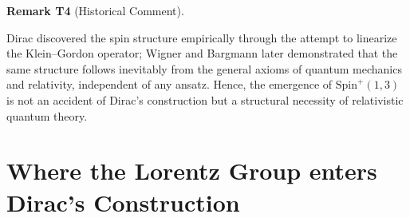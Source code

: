 \documentclass[10pt, letterpaper]{article}
\newcommand{\Spin}{\mathrm{Spin}}
\newcommand{\CustomHeading}[3]{%
  \par\medskip\noindent%
  \textbf{#1 #2} \textnormal{(#3)}.\enskip%
}
\newenvironment{REM}[2]{\begin{unitbox}\CustomHeading{Remark}{#1}{#2}}{\end{unitbox}}
\begin{document}
\begin{REM}{T4}{Historical Comment}
Dirac discovered the spin structure empirically through the attempt to linearize the Klein–Gordon operator;  
Wigner and Bargmann later demonstrated that the same structure follows inevitably from the general axioms of quantum mechanics and relativity, independent of any ansatz.  
Hence, the emergence of $\Spin^+(1,3)$ is not an accident of Dirac’s construction but a structural necessity of relativistic quantum theory.
\end{REM}


\pagebreak


\section{Where the Lorentz Group enters Dirac’s Construction}
\end{document}
